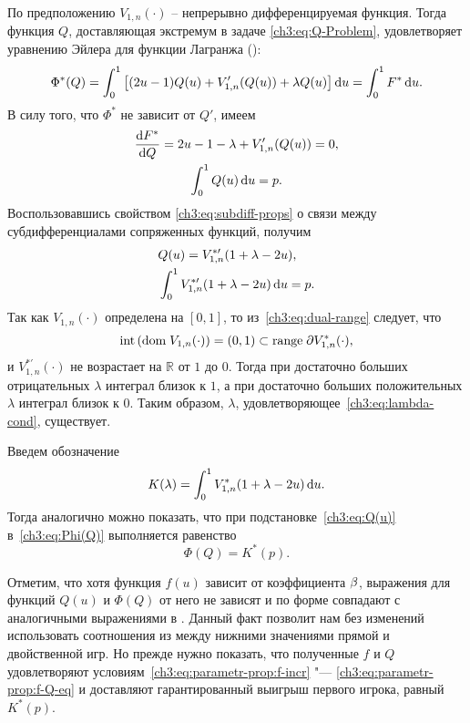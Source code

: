 {По предположению $V_{1,n}(\cdot)$ -- непрерывно дифференцируемая функция.
Тогда функция $Q$, доставляющая экстремум в задаче \eqref{ch3:eq:Q-Problem}, удовлетворяет уравнению Эйлера для функции Лагранжа (\seename \cite{elsgolc69}):
\begin{equation*}
  \Phi^*(Q) =
  \int_0^1 \left[
     (2u - 1) Q(u) + V_{1,n}'(Q(u)) + \lambda Q(u)
   \right] \mathop{}\!\mathrm{d} u =
  \int_0^1 F^* \mathop{}\!\mathrm{d} u.
\end{equation*}
В силу того, что $\Phi^*$ не зависит от $Q'$, имеем
\begin{gather*}
  \frac{\mathop{}\!\mathrm{d} F^*}{\mathop{}\!\mathrm{d} Q} = 2u - 1 - \lambda + V_{1,n}'(Q(u)) = 0,\\
  \int_0^1 Q(u) \mathop{}\!\mathrm{d} u = p.
\end{gather*}
Воспользовавшись свойством \eqref{ch3:eq:subdiff-props} о связи между субдифференциалами сопряженных функций, получим
\begin{align}
  \label{ch3:eq:Q(u)}
  &Q(u) = V^{*\prime}_{1,n}(1+\lambda-2u),\\
  \label{ch3:eq:lambda-cond}
  &\int_0^1 V^{*\prime}_{1,n}(1+\lambda-2u) \mathop{}\!\mathrm{d} u = p.
\end{align}
Так как $V_{1,n}(\cdot)$ определена на $[0, 1]$, то из~\eqref{ch3:eq:dual-range} следует, что
\begin{equation*}
  \mathrm{int} \left( \mathrm{dom\;} V_{1,n}(\cdot) \right)
  = (0, 1)
  \subset \mathrm{range\;} \partial V_{1,n}^*(\cdot),
\end{equation*}
и $V^{*\prime}_{1,n}(\cdot)$ не возрастает на $\mathbb{R}$ от $1$ до $0$.
Тогда при достаточно больших отрицательных $\lambda$ интеграл близок к $1$, а при достаточно больших положительных $\lambda$ интеграл близок к 0.
Таким образом, $\lambda$, удовлетворяющее~\eqref{ch3:eq:lambda-cond}, существует.

Введем обозначение
\begin{equation*}
  K(\lambda) = \int_0^1 V^*_{1,n}(1+\lambda-2u) \mathop{}\!\mathrm{d} u.
\end{equation*}
Тогда аналогично \cite{demeyer02} можно показать, что при подстановке~\eqref{ch3:eq:Q(u)} в~\eqref{ch3:eq:Phi(Q)} выполняется равенство
\begin{equation}\label{ch3:eq:phi=k*}
  \Phi(Q) = K^*(p).
\end{equation}

Отметим, что хотя функция $f(u)$ зависит от коэффициента $\beta$, выражения для функций $Q(u)$ и $\Phi(Q)$ от него не зависят и по форме совпадают с аналогичными выражениями в \cite{demeyer02}.
Данный факт позволит нам без изменений использовать соотношения из \cite{demeyer02} между нижними значениями прямой и двойственной игр.
Но прежде нужно показать, что полученные $f$ и $Q$ удовлетворяют условиям~\eqref{ch3:eq:parametr-prop:f-incr} "--- \eqref{ch3:eq:parametr-prop:f-Q-eq} и доставляют гарантированный выигрыш первого игрока, равный $K^*(p)$.

}
